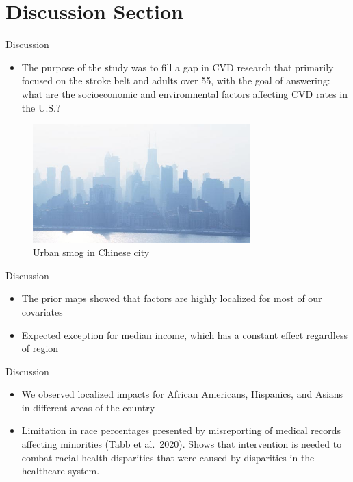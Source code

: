 \documentclass[
  ignorenonframetext,
]{beamer}
\providecommand{\tightlist}{%
  \setlength{\itemsep}{0pt}\setlength{\parskip}{0pt}}\usepackage{longtable,booktabs,array}
\begin{document}
\section{Discussion Section}\label{discussion-section}

\begin{frame}{Discussion}
\label{discussion}
\begin{itemize}
\tightlist
\item
  The purpose of the study was to fill a gap in CVD research that
  primarily focused on the stroke belt and adults over 55, with the goal
  of answering: what are the socioeconomic and environmental factors
  affecting CVD rates in the U.S.?
\end{itemize}

\begin{figure}[H]

{\centering \includegraphics[width=0.75\textwidth,height=\textheight]{PresentationPhotos/urbanPollution.jpg}

}

\caption{Urban smog in Chinese city}

\end{figure}%
\end{frame}

\begin{frame}{Discussion}
\label{discussion-1}
\begin{itemize}
\item
  The prior maps showed that factors are highly localized for most of
  our covariates
\item
  Expected exception for median income, which has a constant effect
  regardless of region
\end{itemize}
\end{frame}

\begin{frame}{Discussion}
\label{discussion-2}
\begin{itemize}
\item
  We observed localized impacts for African Americans, Hispanics, and
  Asians in different areas of the country
\item
  Limitation in race percentages presented by misreporting of medical
  records affecting minorities (Tabb et al.~2020). Shows that
  intervention is needed to combat racial health disparities that were
  caused by disparities in the healthcare system.
\end{itemize}
\end{frame}
\end{document}
